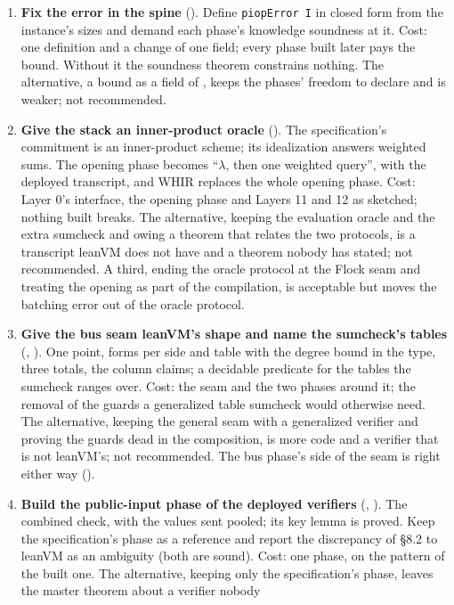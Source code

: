 \begin{enumerate}
\item \textbf{Fix the error in the spine} (). Define \texttt{piopError I} in closed
  form from the instance's sizes and demand each phase's knowledge soundness at it. Cost: one
  definition and a change of one field; every phase built later pays the bound. Without it the
  soundness theorem constrains nothing. The alternative, a bound as a field of
  , keeps the phases' freedom to declare and is weaker; not recommended.
\item \textbf{Give the stack an inner-product oracle} (). The specification's
  commitment is an inner-product scheme; its idealization answers weighted sums. The opening
  phase becomes \enquote{$\lambda$, then one weighted query}, with the deployed transcript, and
  WHIR replaces the whole opening phase. Cost: Layer 0's interface, the opening phase and
  Layers 11 and 12 as sketched; nothing built breaks. The alternative, keeping the evaluation
  oracle and the extra sumcheck and owing a theorem that relates the two protocols, is a
  transcript leanVM does not have and a theorem nobody has stated; not recommended. A third,
  ending the oracle protocol at the Flock seam and treating the opening as part of the
  compilation, is acceptable but moves the batching error out of the oracle protocol.
\item \textbf{Give the bus seam leanVM's shape and name the sumcheck's tables}
  (, ). One point, forms per side and table with the degree bound in the
  type, three totals, the column claims; a decidable predicate for the tables the sumcheck
  ranges over. Cost: the seam and the two phases around it; the removal of the guards a
  generalized table sumcheck would otherwise need. The alternative, keeping the general seam
  with a generalized verifier and proving the guards dead in the composition, is more code and
  a verifier that is not leanVM's; not recommended. The bus phase's side of the seam is right
  either way ().
\item \textbf{Build the public-input phase of the deployed verifiers} (,
  ). The combined check, with the values sent pooled; its key lemma is proved. Keep
  the specification's phase as a reference and report the discrepancy of §8.2 to leanVM as an
  ambiguity (both are sound). Cost: one phase, on the pattern of the built one. The alternative,
  keeping only the specification's phase, leaves the master theorem about a verifier nobody

\end{enumerate}
